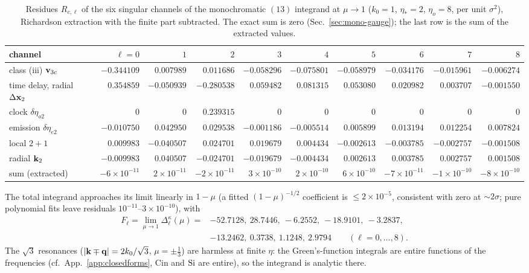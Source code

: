 \begin{table}[t]
\centering\scriptsize\setlength{\tabcolsep}{1.8pt}
\begin{tabular}{l|rrrrrrrrr}
\hline
channel & $\ell=0$ & $1$ & $2$ & $3$ & $4$ & $5$ & $6$ & $7$ & $8$\\ \hline
class (iii) $\mathbf v_{3c}$ & $-0.344109$ & $0.007989$ & $0.011686$ & $-0.058296$ & $-0.075801$ & $-0.058979$ & $-0.034176$ & $-0.015961$ & $-0.006274$\\
time delay, radial $\Delta\mathbf x_2$ & $0.354859$ & $-0.050939$ & $-0.280538$ & $0.059482$ & $0.081315$ & $0.053080$ & $0.020982$ & $0.003707$ & $-0.001550$\\
clock $\delta\eta_{o2}$ & $0$ & $0$ & $0.239315$ & $0$ & $0$ & $0$ & $0$ & $0$ & $0$\\
emission $\delta\eta_{e2}$ & $-0.010750$ & $0.042950$ & $0.029538$ & $-0.001186$ & $-0.005514$ & $0.005899$ & $0.013194$ & $0.012254$ & $0.007824$\\
local $2{+}1$ & $0.009983$ & $-0.040507$ & $0.024701$ & $0.019679$ & $0.004434$ & $-0.002613$ & $-0.003785$ & $-0.002757$ & $-0.001508$\\
radial $\mathbf k_2$ & $-0.009983$ & $0.040507$ & $-0.024701$ & $-0.019679$ & $-0.004434$ & $0.002613$ & $0.003785$ & $0.002757$ & $0.001508$\\ \hline
sum (extracted) & $-6{\times}10^{-11}$ & $2{\times}10^{-11}$ & $-2{\times}10^{-11}$ & $3{\times}10^{-10}$ & $2{\times}10^{-10}$ & $6{\times}10^{-10}$ & $-7{\times}10^{-11}$ & $-1{\times}10^{-10}$ & $-8{\times}10^{-10}$\\ \hline
\end{tabular}
\caption{Residues $R_{c,\ell}$ of the six singular channels of the monochromatic $(13)$ integrand at $\mu\to1$ ($k_0=1$, $\eta_*=2$, $\eta_o=8$,
per unit $\sigma^2$), Richardson extraction with the finite part subtracted.  The exact sum is zero (Sec.~\ref{sec:mono-gauge}); the last row is the
sum of the extracted values.}
\label{tab:mono-res}
\end{table}
The total integrand approaches its limit linearly in $1-\mu$ (a fitted $(1-\mu)^{-1/2}$ coefficient is $\le2\times10^{-5}$, consistent with zero at
$\sim2\sigma$; pure polynomial fits leave residuals $10^{-11}$--$3\times10^{-10}$), with
\begin{equation}
\begin{split}F_\ell=\lim_{\mu\to1}\Delta^\kappa_\ell(\mu)={}&-52.7128,\ 28.7446,\ -6.2552,\ -18.9101,\ -3.2837,\\
&-13.2462,\ 0.3738,\ 1.1248,\ 2.9794\qquad(\ell=0,\dots,8).\end{split}
\label{eq:mono-Fl}
\end{equation}
The $\sqrt3$ resonances ($|\mathbf k\mp\mathbf q|=2k_0/\sqrt3$, $\mu=\pm\tfrac13$) are harmless at finite $\eta$: the Green's-function integrals are entire
functions of the frequencies (cf.\ App.~\ref{app:closedforms}, $\mathrm{Cin}$ and $\operatorname{Si}$ are entire), so the integrand is analytic there.

